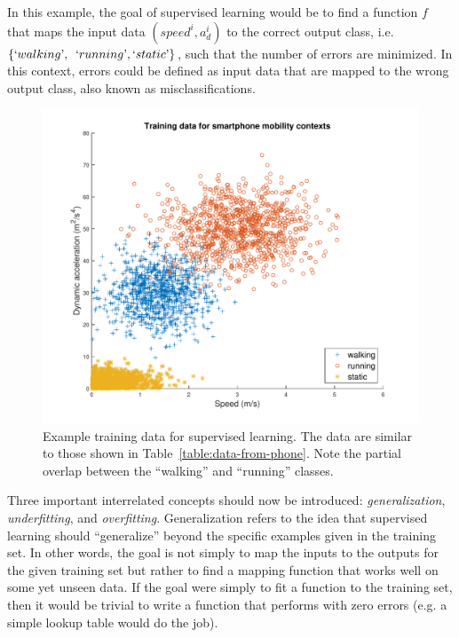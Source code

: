 %
In this example, the goal of supervised learning would be to find a function $f$ that maps the input data $(speed^i,a_d^i)$ to the correct output class, i.e.  $\{`walking\textrm',$ $`running\textrm',`static\textrm'\}$, such that the number of errors are minimized. In this context, errors could be defined as input data that are mapped to the wrong output class, also known as misclassifications.
%
\begin{figure}

\begin{center}
    \includegraphics[width=1.0\textwidth]{Images/figChapter3-1}
  \end{center}
  \caption[Training data for supervised learning]{Example training data for supervised learning. The data are similar to those shown in Table~\ref{table:data-from-phone}. Note the partial overlap between the ``walking'' and ``running'' classes.}
  \label{fig:data-from-phone-supervised}
\end{figure}

Three important interrelated concepts should now be introduced: \emph{generalization}, \emph{underfitting}, and \emph{overfitting}. Generalization refers to the idea that supervised learning should ``generalize'' beyond the specific examples given in the training set. In other words, the goal is not simply to map the inputs to the outputs for the given training set but rather to find a mapping function that works well on some yet unseen data. If the goal were simply to fit a function to the training set, then it would be trivial to write a function that performs with zero errors (e.g. a simple lookup table would do the job).

